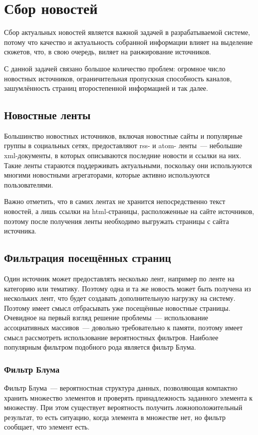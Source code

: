 \section{Сбор новостей} \label{sec:collecting}
Сбор актуальных новостей является важной задачей в разрабатываемой системе, потому что качество и актуальность собранной информации влияет на выделение сюжетов, что, в свою очередь, виляет на ранжирование источников.

С данной задачей связано большое количество проблем: огромное число новостных источников, ограничительная пропускная способность каналов, зашумлённость страниц второстепенной информацией и так далее.

\subsection{Новостные ленты}
Большинство новостных источников, включая новостные сайты и популярные группы в социальных сетях, предоставляют rss- и atom- ленты~--- небольшие xml-документы, в которых описываются последние новости и ссылки на них. Такие ленты стараются поддерживать актуальными, поскольку они используются многими новостными агрегаторами, которые активно используются пользователями.

Важно отметить, что в самих лентах не хранится непосредственно текст новостей, а лишь ссылки на html-страницы, расположенные на сайте источников, поэтому после получения ленты необходимо выгружать страницы с сайта источника.

\subsection{Фильтрация посещённых страниц}
Один источник может предоставлять несколько лент, например по ленте на категорию или тематику. Поэтому одна и та же новость может быть получена из нескольких лент, что будет создавать дополнительную нагрузку на систему. Поэтому имеет смысл отбрасывать уже посещённые новостные страницы. Очевидное на первый взгляд решение проблемы~--- использование ассоциативных массивов~--- довольно требовательно к памяти, поэтому имеет смысл рассмотреть использование вероятностных фильтров. Наиболее популярным фильтром подобного рода является фильтр Блума.

\subsubsection{Фильтр Блума} \label{sssec:bloom-filter}
Фильтр Блума~--- вероятностная структура данных, позволяющая компактно хранить множество элементов и проверять принадлежность заданного элемента к множеству. При этом существует вероятность получить ложноположительный результат, то есть ситуацию, когда элемента в множестве нет, но фильтр сообщает, что элемент есть.

